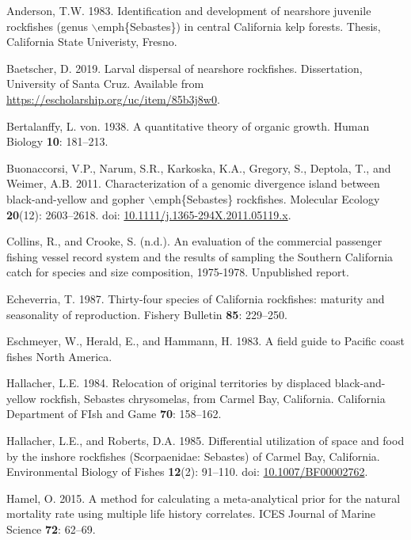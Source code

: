 \documentclass[12pt,]{article}
\begin{document}
\hypertarget{ref-Anderson1983}{}
Anderson, T.W. 1983. Identification and development of nearshore
juvenile rockfishes (genus \(\backslash\)emph\{Sebastes\}) in central
California kelp forests. Thesis, California State Univeristy, Fresno.

\hypertarget{ref-Baetscher2019}{}
Baetscher, D. 2019. Larval dispersal of nearshore rockfishes.
Dissertation, University of Santa Cruz. Available from
\url{https://escholarship.org/uc/item/85b3j8w0}.

\hypertarget{ref-vonB1938}{}
Bertalanffy, L. von. 1938. A quantitative theory of organic growth.
Human Biology \textbf{10}: 181--213.

\hypertarget{ref-Buonaccorsi2011}{}
Buonaccorsi, V.P., Narum, S.R., Karkoska, K.A., Gregory, S., Deptola,
T., and Weimer, A.B. 2011. Characterization of a genomic divergence
island between black-and-yellow and gopher
\(\backslash\)emph\{Sebastes\} rockfishes. Molecular Ecology
\textbf{20}(12): 2603--2618. doi:
\href{https://doi.org/10.1111/j.1365-294X.2011.05119.x}{10.1111/j.1365-294X.2011.05119.x}.

\hypertarget{ref-Collins1978}{}
Collins, R., and Crooke, S. (n.d.). An evaluation of the commercial
passenger fishing vessel record system and the results of sampling the
Southern California catch for species and size composition, 1975-1978.
Unpublished report.

\hypertarget{ref-Echeverria1987}{}
Echeverria, T. 1987. Thirty-four species of California rockfishes:
maturity and seasonality of reproduction. Fishery Bulletin \textbf{85}:
229--250.

\hypertarget{ref-Eschmeyer1983}{}
Eschmeyer, W., Herald, E., and Hammann, H. 1983. A field guide to
Pacific coast fishes North America.

\hypertarget{ref-Hallacher1984}{}
Hallacher, L.E. 1984. Relocation of original territories by displaced
black-and-yellow rockfish, Sebastes chrysomelas, from Carmel Bay,
California. California Department of FIsh and Game \textbf{70}:
158--162.

\hypertarget{ref-Hallacher1985}{}
Hallacher, L.E., and Roberts, D.A. 1985. Differential utilization of
space and food by the inshore rockfishes (Scorpaenidae: Sebastes) of
Carmel Bay, California. Environmental Biology of Fishes \textbf{12}(2):
91--110. doi:
\href{https://doi.org/10.1007/BF00002762}{10.1007/BF00002762}.

\hypertarget{ref-Hamel2015}{}
Hamel, O. 2015. A method for calculating a meta-analytical prior for the
natural mortality rate using multiple life history correlates. ICES
Journal of Marine Science \textbf{72}: 62--69.
\end{document}
